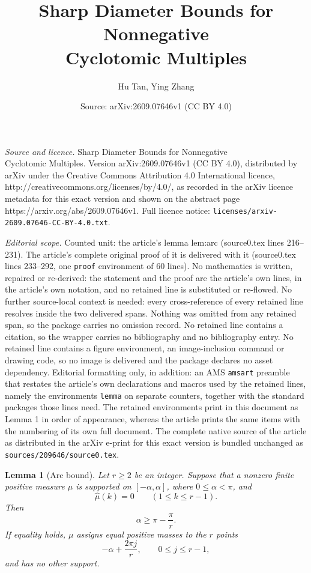 \documentclass[10pt,a4paper]{amsart}
\title{Sharp Diameter Bounds for Nonnegative\\Cyclotomic Multiples}
\author{Hu Tan, Ying Zhang}
\date{Source: arXiv:2609.07646v1 (CC BY 4.0)}
\newtheorem{lemma}{Lemma}
\begin{document}
\maketitle

\noindent\emph{Source and licence.} Sharp Diameter Bounds for Nonnegative\\Cyclotomic Multiples. Version arXiv:2609.07646v1 (CC BY 4.0), distributed by arXiv under the Creative Commons Attribution 4.0 International licence, http://creativecommons.org/licenses/by/4.0/, as recorded in the arXiv licence metadata for this exact version and shown on the abstract page https://arxiv.org/abs/2609.07646v1. Full licence notice: \texttt{licenses/arxiv-2609.07646-CC-BY-4.0.txt}.\par\smallskip

\noindent\textit{Editorial scope.} Counted unit: the article's lemma lem:arc (source0.tex lines 216--231). The article's complete original proof of it is delivered with it (source0.tex lines 233--292, one \texttt{proof} environment of 60 lines). No mathematics is written, repaired or re-derived: the statement and the proof are the article's own lines, in the article's own notation, and no retained line is substituted or re-flowed.  No further source-local context is needed: every cross-reference of every retained line resolves inside the two delivered spans.  Nothing was omitted from any retained span, so the package carries no omission record.  No retained line contains a citation, so the wrapper carries no bibliography and no bibliography entry.  No retained line contains a figure environment, an image-inclusion command or drawing code, so no image is delivered and the package declares no asset dependency.  Editorial formatting only, in addition: an AMS \texttt{amsart} preamble that restates the article's own declarations and macros used by the retained lines, namely the environments \texttt{lemma} on separate counters, together with the standard packages those lines need.  The retained environments print in this document as Lemma 1 in order of appearance, whereas the article prints the same items with the numbering of its own full document.  The complete native source of the article as distributed in the arXiv e-print for this exact version is bundled unchanged as \texttt{sources/209646/source0.tex}.
\begin{lemma}[Arc bound]\label{lem:arc}
Let $r\ge2$ be an integer. Suppose that a nonzero finite positive measure
$\mu$ is supported on $[-\alpha,\alpha]$, where $0\le\alpha<\pi$, and
\begin{equation}\label{eq:moments}
 \widehat\mu(k)=0\qquad(1\le k\le r-1).
\end{equation}
Then
\begin{equation}\label{eq:arc-bound}
 \alpha\ge\pi-\frac\pi r.
\end{equation}
If equality holds, $\mu$ assigns equal positive masses to the $r$ points
\begin{equation}\label{eq:nodes}
 -\alpha+\frac{2\pi j}{r},\qquad 0\le j\le r-1,
\end{equation}
and has no other support.
\end{lemma}
\end{document}
